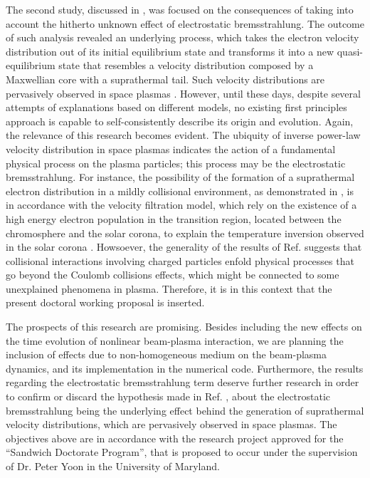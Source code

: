 \documentclass[12pt,a4paper,ruledheader]{report}
\begin{document}
The second study, discussed in , was focused on the
consequences of taking into account the hitherto unknown effect of
electrostatic bremsstrahlung. The outcome of such analysis revealed an
underlying process, which takes the electron velocity distribution
out of its initial equilibrium state and transforms it into a new
quasi-equilibrium state that resembles a velocity distribution composed
by a Maxwellian core with a suprathermal tail. Such velocity distributions
are pervasively observed in space plasmas \cite{Parker1958a,Vasyliunas68,
  Coroniti1974,FABMG75,Lin1998,Horne2005,Clark2015,Padovani2015,deSoria2016,
  Padovani2017,Deca2017}. However, until these
days, despite several attempts of explanations based on different models,
no existing first principles approach is capable to self-consistently
describe its origin and evolution. Again, the relevance of this research
becomes evident. The ubiquity of inverse power-law velocity distribution
in space plasmas indicates the action of a fundamental physical process on
the plasma particles; this process may be the electrostatic bremsstrahlung.
For instance, the possibility of the formation of a suprathermal electron
distribution in a mildly collisional environment, as demonstrated in
\cite{Tigik2017a}, is in accordance with the velocity filtration model,
which rely on the existence of a high energy electron population in the
transition region, located between the chromosphere and the solar corona,
to explain the temperature inversion observed in the solar corona \cite{
  Scudder92a,Scudder92b,Anderson94,Scudder94,Scudder96,DS99,DS03,Teles15}.
Howsoever, the generality of the results of Ref. \cite{Tigik2017a} suggests
that collisional interactions involving charged particles enfold physical
processes that go beyond the Coulomb collisions effects, which might be
connected to some unexplained phenomena in plasma. Therefore, it is in
this context that the present doctoral working proposal is inserted.

The prospects of this research are promising. Besides including the
new effects on the time evolution of nonlinear beam-plasma interaction,
we are planning the inclusion of effects due to non-homogeneous
medium on the beam-plasma dynamics, and its implementation in the numerical
code. Furthermore, the results regarding
the electrostatic bremsstrahlung term deserve further research in order
to confirm or discard the hypothesis made in Ref. \cite{Tigik2017a}, about
the electrostatic bremsstrahlung being the underlying effect behind the
generation of suprathermal velocity distributions, which are pervasively
observed in space plasmas. The objectives above are in accordance with
the research project approved for the ``Sandwich Doctorate Program'',
that is proposed to occur under the supervision of Dr. Peter Yoon in the
University of Maryland.
\end{document}
